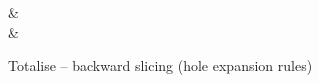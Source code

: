 \begin{figure}[H]
\flushleft \shadebox{$\pi \totaliseBwdHole \sigma$}
\begin{salign}
   &\totaliseBwdHole
   \\
   \pattTrue
   &\totaliseBwdHole
   \elimBool{\hole}{\annNil{\FF}}
\end{salign}
\caption{Totalise -- backward slicing (hole expansion rules)}
\end{figure}
